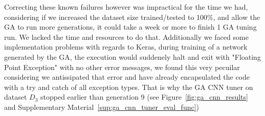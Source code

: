 Correcting these known failures however was impractical for the time we had,  considering if we increased the dataset size trained/tested to 100\%, and allow the GA to run more generations, it could take a week or more to finish 1 GA tuning run. We lacked the time and resources to do that. Additionally we faced some implementation problems with regards to Keras, during training of a network generated by the GA, the execution would suddenely halt and exit with "Floating Point Exception" with no other error messages, we found this very pecuilar considering we antissipated that error and have already encapsulated the code with a try and catch of all exception types. That is why the GA CNN tuner on dataset $D_{3}$ stopped earlier than generation 9 (see Figure~\ref{fig:ga_cnn_results} and Supplementary Material~\ref{sup:ga_cnn_tuner_eval_func})





